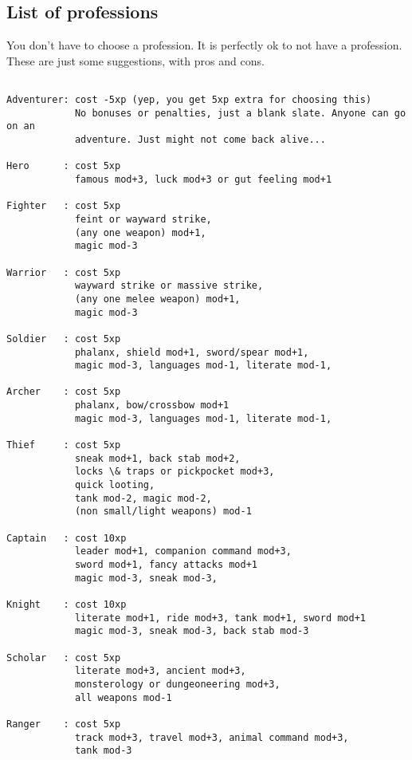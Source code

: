 \subsection*{List of professions}

You don't have to choose a profession. It is perfectly ok to not have a profession. These are just some suggestions, with pros and cons.


\small\begin{verbatim}

Adventurer: cost -5xp (yep, you get 5xp extra for choosing this)
            No bonuses or penalties, just a blank slate. Anyone can go on an
            adventure. Just might not come back alive...

Hero      : cost 5xp
            famous mod+3, luck mod+3 or gut feeling mod+1

Fighter   : cost 5xp
            feint or wayward strike,
            (any one weapon) mod+1,
            magic mod-3

Warrior   : cost 5xp
            wayward strike or massive strike,
            (any one melee weapon) mod+1,
            magic mod-3

Soldier   : cost 5xp
            phalanx, shield mod+1, sword/spear mod+1,
            magic mod-3, languages mod-1, literate mod-1,

Archer    : cost 5xp
            phalanx, bow/crossbow mod+1
            magic mod-3, languages mod-1, literate mod-1,

Thief     : cost 5xp
            sneak mod+1, back stab mod+2,
            locks \& traps or pickpocket mod+3,
            quick looting,
            tank mod-2, magic mod-2,
            (non small/light weapons) mod-1

Captain   : cost 10xp
            leader mod+1, companion command mod+3,
            sword mod+1, fancy attacks mod+1
            magic mod-3, sneak mod-3,

Knight    : cost 10xp
            literate mod+1, ride mod+3, tank mod+1, sword mod+1
            magic mod-3, sneak mod-3, back stab mod-3

Scholar   : cost 5xp
            literate mod+3, ancient mod+3,
            monsterology or dungeoneering mod+3,
            all weapons mod-1

Ranger    : cost 5xp
            track mod+3, travel mod+3, animal command mod+3,
            tank mod-3


\end{verbatim}
